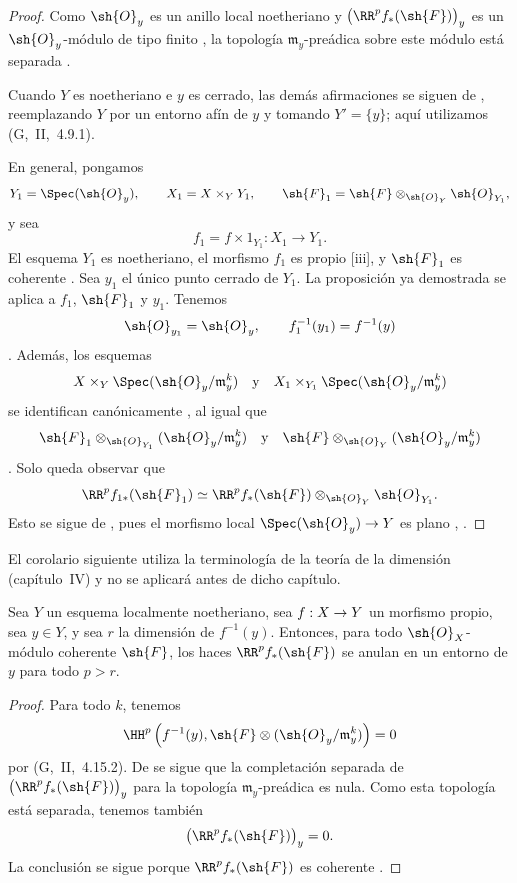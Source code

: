 \documentclass[oneside]{amsart}
\makeatletter
\newcommand{\ega@arrow}[2]{\mathchoice{#1}{#2}{#2}{#2}}
\renewcommand{\to}{\ega@arrow{\longrightarrow}{\rightarrow}}
\let\EGAOriginalLabel\label
\renewcommand{\label}[1]{\phantomsection\EGAOriginalLabel{#1}}
\makeatother
\begin{document}
\begin{proof}
Como $\sh{O}_y$ es un anillo local noetheriano y
$\bigl(\RR^p f_*(\sh{F})\bigr)_y$ es un $\sh{O}_y$-módulo de tipo
finito , la topología $\mathfrak{m}_y$-preádica sobre
este módulo está separada .

Cuando $Y$ es noetheriano e $y$ es cerrado, las demás afirmaciones se
siguen de , reemplazando $Y$ por un entorno afín de
$y$ y tomando $Y'=\{y\}$; aquí utilizamos (G,~II,~4.9.1).

En general, pongamos
\[
  Y_1=\Spec(\sh{O}_y),
  \qquad
  X_1=X\times_Y Y_1,
  \qquad
  \sh{F}_1
  =
  \sh{F}\otimes_{\sh{O}_Y}\sh{O}_{Y_1},
\]
y sea
\[
  f_1=f\times 1_{Y_1}:X_1\longrightarrow Y_1.
\]
El esquema $Y_1$ es noetheriano, el morfismo $f_1$ es propio
[iii], y $\sh{F}_1$ es coherente
.
Sea $y_1$ el único punto cerrado de $Y_1$.
La proposición ya demostrada se aplica a $f_1$, $\sh{F}_1$ y
$y_1$.
Tenemos
\[
  \sh{O}_{y_1}=\sh{O}_y,
  \qquad
  f_1^{-1}(y_1)=f^{-1}(y)
\]
.
Además, los esquemas
\[
  X\times_Y\Spec(\sh{O}_y/\mathfrak{m}_y^k)
  \quad\text{y}\quad
  X_1\times_{Y_1}\Spec(\sh{O}_y/\mathfrak{m}_y^k)
\]
se identifican canónicamente , al igual que
\[
  \sh{F}_1
  \otimes_{\sh{O}_{Y_1}}
  (\sh{O}_y/\mathfrak{m}_y^k)
  \quad\text{y}\quad
  \sh{F}
  \otimes_{\sh{O}_Y}
  (\sh{O}_y/\mathfrak{m}_y^k)
\]
.
Solo queda observar que
\[
  \RR^p f_{1*}(\sh{F}_1)
  \simeq
  \RR^p f_*(\sh{F})
  \otimes_{\sh{O}_Y}
  \sh{O}_{Y_1}.
\]
Esto se sigue de , pues el morfismo local
$\Spec(\sh{O}_y)\to Y$ es plano
, .
\end{proof}

El corolario siguiente utiliza la terminología de la teoría de la
dimensión (capítulo~IV) y no se aplicará antes de dicho capítulo.

\begin{corollary}[4.2.2]
\label{III.4.2.2}
Sea $Y$ un esquema localmente noetheriano, sea $f:X\to Y$ un
morfismo propio, sea $y\in Y$, y sea $r$ la dimensión de
$f^{-1}(y)$.
Entonces, para todo $\sh{O}_X$-módulo coherente $\sh{F}$, los haces
$\RR^p f_*(\sh{F})$ se anulan en un entorno de $y$ para todo
$p>r$.
\end{corollary}

\begin{proof}
Para todo $k$, tenemos
\[
  \HH^p\left(
    f^{-1}(y),
    \sh{F}\otimes
    (\sh{O}_y/\mathfrak{m}_y^k)
  \right)
  =
  0
\]
por (G,~II,~4.15.2).
De  se sigue que la completación separada de
$\bigl(\RR^p f_*(\sh{F})\bigr)_y$ para la topología
$\mathfrak{m}_y$-preádica es nula.
Como esta topología está separada, tenemos también
\[
  \bigl(\RR^p f_*(\sh{F})\bigr)_y=0.
\]
La conclusión se sigue porque $\RR^p f_*(\sh{F})$ es coherente
.
\end{proof}
\end{document}
